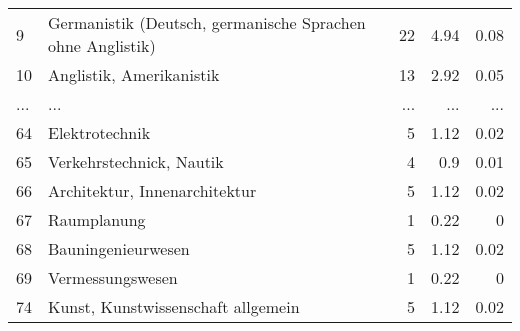 \begin{longtable}{lXrrr}
        9 & \multicolumn{1}{X}{Germanistik (Deutsch, germanische Sprachen ohne Anglistik)} & %
          \num{22} &
          \num[round-mode=places,round-precision=2]{4.94} &
          \num[round-mode=places,round-precision=2]{0.08} \\
        10 & \multicolumn{1}{X}{Anglistik, Amerikanistik} & %
          \num{13} &
          \num[round-mode=places,round-precision=2]{2.92} &
          \num[round-mode=places,round-precision=2]{0.05} \\
       ... & ... & ... & ... & ... \\
        64 & \multicolumn{1}{X}{Elektrotechnik} & %
          \num{5} &
          \num[round-mode=places,round-precision=2]{1.12} &
          \num[round-mode=places,round-precision=2]{0.02} \\

        65 & \multicolumn{1}{X}{Verkehrstechnick, Nautik} & %
          \num{4} &
          \num[round-mode=places,round-precision=2]{0.9} &
          \num[round-mode=places,round-precision=2]{0.01} \\

        66 & \multicolumn{1}{X}{Architektur, Innenarchitektur} & %
          \num{5} &
          \num[round-mode=places,round-precision=2]{1.12} &
          \num[round-mode=places,round-precision=2]{0.02} \\

        67 & \multicolumn{1}{X}{Raumplanung} & %
          \num{1} &
          \num[round-mode=places,round-precision=2]{0.22} &
          \num[round-mode=places,round-precision=2]{0} \\

        68 & \multicolumn{1}{X}{Bauningenieurwesen} & %
          \num{5} &
          \num[round-mode=places,round-precision=2]{1.12} &
          \num[round-mode=places,round-precision=2]{0.02} \\

        69 & \multicolumn{1}{X}{Vermessungswesen} & %
          \num{1} &
          \num[round-mode=places,round-precision=2]{0.22} &
          \num[round-mode=places,round-precision=2]{0} \\

        74 & \multicolumn{1}{X}{Kunst, Kunstwissenschaft allgemein} & %
          \num{5} &
          \num[round-mode=places,round-precision=2]{1.12} &
          \num[round-mode=places,round-precision=2]{0.02} \\


\end{longtable}
